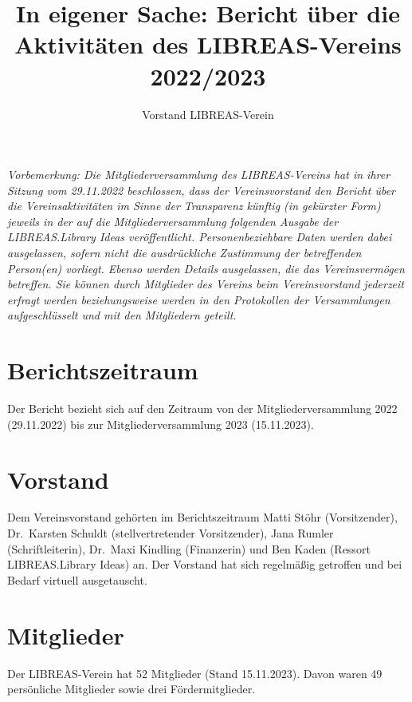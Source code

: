 \documentclass[a4paper,
fontsize=11pt,
oneside,
numbers=noperiodatend,
parskip=half-,
bibliography=totoc,
final
]{scrartcl}
\title{\LARGE{In eigener Sache: Bericht über die Aktivitäten des LIBREAS-Vereins 2022/2023}}%
\author{Vorstand LIBREAS-Verein} %
\date{}
\begin{document}
\maketitle
\thispagestyle{fancyplain} 


\emph{Vorbemerkung: Die Mitgliederversammlung des LIBREAS-Vereins hat in
ihrer Sitzung vom 29.11.2022 beschlossen, dass der Vereinsvorstand den
Bericht über die Vereinsaktivitäten im Sinne der Transparenz künftig (in
gekürzter Form) jeweils in der auf die Mitgliederversammlung folgenden
Ausgabe der LIBREAS.Library Ideas veröffentlicht. Personenbeziehbare
Daten werden dabei ausgelassen, sofern nicht die ausdrückliche
Zustimmung der betreffenden Person(en) vorliegt. Ebenso werden Details
ausgelassen, die das Vereinsvermögen betreffen. Sie können durch
Mitglieder des Vereins beim Vereinsvorstand jederzeit erfragt werden
beziehungsweise werden in den Protokollen der Versammlungen
aufgeschlüsselt und mit den Mitgliedern geteilt.}

\hypertarget{berichtszeitraum}{%
\section{Berichtszeitraum}\label{berichtszeitraum}}

Der Bericht bezieht sich auf den Zeitraum von der Mitgliederversammlung
2022 (29.11.2022) bis zur Mitgliederversammlung 2023 (15.11.2023).

\hypertarget{vorstand}{%
\section{Vorstand}\label{vorstand}}

Dem Vereinsvorstand gehörten im Berichtszeitraum Matti Stöhr
(Vorsitzender), Dr.~Karsten Schuldt (stellvertretender Vorsitzender),
Jana Rumler (Schriftleiterin), Dr.~Maxi Kindling (Finanzerin) und Ben
Kaden (Ressort LIBREAS.Library Ideas) an. Der Vorstand hat sich
regelmäßig getroffen und bei Bedarf virtuell ausgetauscht.

\hypertarget{mitglieder}{%
\section{Mitglieder}\label{mitglieder}}

Der LIBREAS-Verein hat 52 Mitglieder (Stand 15.11.2023). Davon waren 49
persönliche Mitglieder sowie drei Fördermitglieder.
\end{document}
